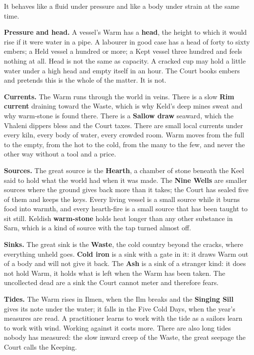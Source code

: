 \documentclass{design/chronicle}
\begin{document}
It behaves like a fluid under pressure and like a body under strain at the same time.

\textbf{Pressure and head.} A vessel’s Warm has a \textbf{head}, the height to which it would rise if it were water in a pipe. A labourer in good case has a head of forty to sixty embers; a Held vessel a hundred or more; a Kept vessel three hundred and feels nothing at all. Head is not the same as capacity. A cracked cup may hold a little water under a high head and empty itself in an hour. The Court books embers and pretends this is the whole of the matter. It is not.

\textbf{Currents.} The Warm runs through the world in veins. There is a slow \textbf{Rim current} draining toward the Waste, which is why Keld’s deep mines sweat and why warm-stone is found there. There is a \textbf{Sallow draw} seaward, which the Vhaleni dippers bless and the Court taxes. There are small local currents under every kiln, every body of water, every crowded room. Warm moves from the full to the empty, from the hot to the cold, from the many to the few, and never the other way without a tool and a price.

\textbf{Sources.} The great source is the \textbf{Hearth}, a chamber of stone beneath the Keel said to hold what the world had when it was made. The \textbf{Nine Wells} are smaller sources where the ground gives back more than it takes; the Court has sealed five of them and keeps the keys. Every living vessel is a small source while it burns food into warmth, and every hearth-fire is a small source that has been taught to sit still. Keldish \textbf{warm-stone} holds heat longer than any other substance in Sarn, which is a kind of source with the tap turned almost off.

\textbf{Sinks.} The great sink is the \textbf{Waste}, the cold country beyond the cracks, where everything unheld goes. \textbf{Cold iron} is a sink with a gate in it: it draws Warm out of a body and will not give it back. The \textbf{Ash} is a sink of a stranger kind: it does not hold Warm, it holds what is left when the Warm has been taken. The uncollected dead are a sink the Court cannot meter and therefore fears.

\textbf{Tides.} The Warm rises in Ilmen, when the Ilm breaks and the \textbf{Singing Sill} gives its note under the water; it falls in the Five Cold Days, when the year’s measures are read. A practitioner learns to work with the tide as a sailors learn to work with wind. Working against it costs more. There are also long tides nobody has measured: the slow inward creep of the Waste, the great seepage the Court calls the Keeping.
\end{document}
